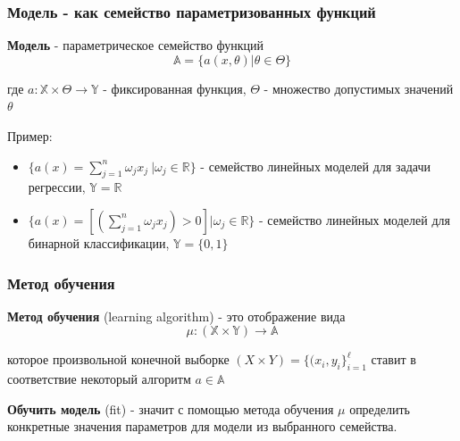 \documentclass{beamer}
\begin{document}
	\begin{frame}
		\frametitle{Модель - как семейство параметризованных функций}
		
		\textbf{Модель} - параметрическое семейство функций
		$$
		\mathbb{A} = \{a(x, \theta) | \theta \in \Theta\}
		$$
		
		где $a: \mathbb{X} \times \Theta \to \mathbb{Y}$ - фиксированная функция,
		$\Theta$ - множество допустимых значений $\theta$
		
		\vspace{15pt}
		
		Пример:
		
		\begin{itemize}
			\item $\{a(x) = \sum_{j=1}^{n} \omega_j x_j\ | \omega_j \in \mathbb{R}\}$ - семейство линейных моделей для задачи регрессии, $\mathbb{Y} = \mathbb{R}$
			
			\item $\{a(x) = [(\sum_{j=1}^{n} \omega_j x_j) > 0] | \omega_j \in \mathbb{R}\}$ - семейство линейных моделей для бинарной классификации, $\mathbb{Y} = \{0, 1\}$
		\end{itemize}
	\end{frame}


	\begin{frame}
		\frametitle{Метод обучения}
		
		\textbf{Метод обучения} (learning algorithm) - это отображение вида
		$$
		\mu : (\mathbb{X} \times \mathbb{Y}) \to \mathbb{A}
		$$
		
		которое произвольной конечной выборке $(X \times Y) = \{(x_i, y_i\}_{i=1}^{\ell}$ ставит в соответствие 
		некоторый алгоритм $a \in \mathbb{A}$
		
		\vspace{15pt}
		
		\textbf{Обучить модель} (fit) - значит с помощью метода обучения $\mu$ определить конкретные значения параметров для модели из выбранного семейства.
	\end{frame}
\end{document}

